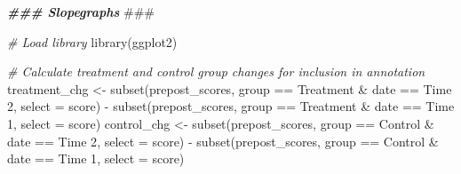 \documentclass[
]{book}
\newenvironment{Shaded}{\begin{snugshade}}{\end{snugshade}}
\newcommand{\AlertTok}[1]{\textcolor[rgb]{0.94,0.16,0.16}{#1}}
\newcommand{\AttributeTok}[1]{\textcolor[rgb]{0.77,0.63,0.00}{#1}}
\newcommand{\CommentTok}[1]{\textcolor[rgb]{0.56,0.35,0.01}{\textit{#1}}}
\newcommand{\DocumentationTok}[1]{\textcolor[rgb]{0.56,0.35,0.01}{\textbf{\textit{#1}}}}
\newcommand{\FunctionTok}[1]{\textcolor[rgb]{0.00,0.00,0.00}{#1}}
\newcommand{\NormalTok}[1]{#1}
\newcommand{\OtherTok}[1]{\textcolor[rgb]{0.56,0.35,0.01}{#1}}
\newcommand{\SpecialCharTok}[1]{\textcolor[rgb]{0.00,0.00,0.00}{#1}}
\newcommand{\StringTok}[1]{\textcolor[rgb]{0.31,0.60,0.02}{#1}}
\begin{document}
\begin{Shaded}
\begin{Highlighting}[]
\DocumentationTok{\#\#\# Slopegraphs }\AlertTok{\#\#\#}

\CommentTok{\# Load library}
\FunctionTok{library}\NormalTok{(ggplot2)}

\CommentTok{\# Calculate treatment and control group changes for inclusion in annotation}
\NormalTok{treatment\_chg }\OtherTok{\textless{}{-}} \FunctionTok{subset}\NormalTok{(prepost\_scores, group }\SpecialCharTok{==} \StringTok{\textquotesingle{}Treatment\textquotesingle{}} \SpecialCharTok{\&}\NormalTok{ date }\SpecialCharTok{==} \StringTok{\textquotesingle{}Time 2\textquotesingle{}}\NormalTok{, }\AttributeTok{select =}\NormalTok{ score) }\SpecialCharTok{{-}} \FunctionTok{subset}\NormalTok{(prepost\_scores, group }\SpecialCharTok{==} \StringTok{\textquotesingle{}Treatment\textquotesingle{}} \SpecialCharTok{\&}\NormalTok{ date }\SpecialCharTok{==} \StringTok{\textquotesingle{}Time 1\textquotesingle{}}\NormalTok{, }\AttributeTok{select =}\NormalTok{ score)}
\NormalTok{control\_chg }\OtherTok{\textless{}{-}} \FunctionTok{subset}\NormalTok{(prepost\_scores, group }\SpecialCharTok{==} \StringTok{\textquotesingle{}Control\textquotesingle{}} \SpecialCharTok{\&}\NormalTok{ date }\SpecialCharTok{==} \StringTok{\textquotesingle{}Time 2\textquotesingle{}}\NormalTok{, }\AttributeTok{select =}\NormalTok{ score) }\SpecialCharTok{{-}} \FunctionTok{subset}\NormalTok{(prepost\_scores, group }\SpecialCharTok{==} \StringTok{\textquotesingle{}Control\textquotesingle{}} \SpecialCharTok{\&}\NormalTok{ date }\SpecialCharTok{==} \StringTok{\textquotesingle{}Time 1\textquotesingle{}}\NormalTok{, }\AttributeTok{select =}\NormalTok{ score)}


\end{Highlighting}
\end{Shaded}
\end{document}
